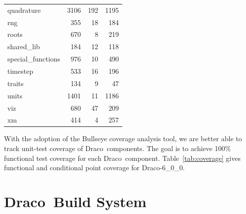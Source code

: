 \documentclass[note]{ResearchNote}
\newcommand{\draco}{Draco}
\newcommand{\dracor}{\draco-6\_0\_0}
\begin{document}
\begin{table}
\begin{center}
\begin{tabular}{lrrr}
      quadrature         &      3106     &      192      &      1195     \\
      rng                &       355     &       18      &       184     \\
      roots              &       670     &        8      &       219     \\
      shared\_lib        &       184     &       12      &       118     \\
      special\_functions &       976     &       10      &       490     \\
      timestep           &       533     &       16      &       196     \\
      traits             &       134     &       9       &       47      \\
      units              &      1401     &       11      &       1186    \\
      viz                &       680     &       47      &       209     \\
      xm                 &       414     &       4       &       257     \\
      \hline\hline
    \end{tabular}
  \end{center}
\end{table}





With the adoption of the \textsf{Bullseye} coverage analysis tool, we
are better able to track unit-test coverage of \draco\ components.
The goal is to achieve 100\% functional test coverage for each \draco\
component.  Table~\ref{tab:coverage} gives functional and conditional
point coverage for \dracor.



\section{\draco\ Build System}
\label{sec:dbs}
\end{document}
